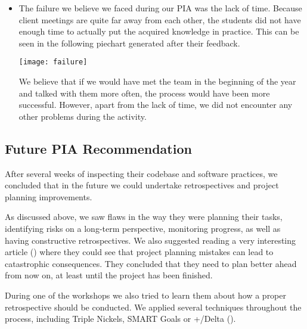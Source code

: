 \documentclass[11pt]{article}
\begin{document}
\begin{itemize}
\item The failure we believe we faced during our PIA was the lack of time. Because client meetings are quite far away from each other, the students did not have enough time to actually put the acquired knowledge in practice. This can be seen in the following piechart generated after their feedback.

\texttt{[image: failure]}

We believe that if we would have met the team in the beginning of the year and talked with them more often, the process would have been more successful. However, apart from the lack of time, we did not encounter any other problems during the activity.

\end{itemize}


\subsection*{Future PIA Recommendation}

\par
After several weeks of inspecting their codebase and software practices, we concluded that in the future we could undertake retrospectives and project planning improvements. 

\par
As discussed above, we saw flaws in the way they were planning their tasks, identifying risks on a long-term perspective, monitoring progress, as well as having constructive retrospectives. We also suggested reading a very interesting article (\citet{software-fails}) where they could see that project planning mistakes can lead to catastrophic consequences. They concluded that they need to plan better ahead from now on, at least until the project has been finished.

\par
During one of the workshops we also tried to learn them about how a proper retrospective should be conducted. We applied several techniques throughout the process, including Triple Nickels, SMART Goals or +/Delta (\citet{agile-retrospectives}).




\end{document}
